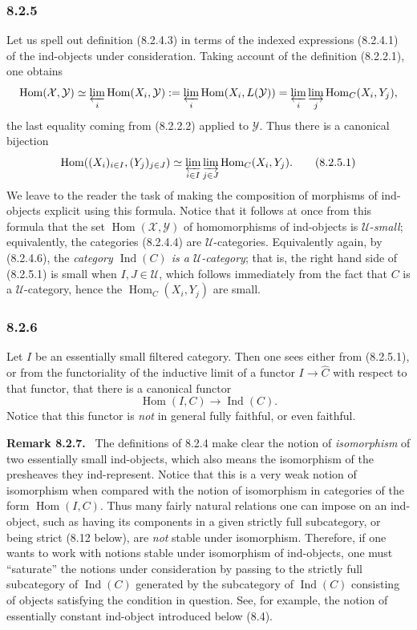 \documentclass[11pt]{article}
\newcommand{\U}{\mathcal{U}}
\newcommand{\Hom}{\operatorname{Hom}}
\newcommand{\Ind}{\operatorname{Ind}}
\newcommand{\Hhom}{\operatorname{Hom}}
\newenvironment{statement}[1]{\par\medskip\noindent\textbf{#1.}\ }{\par\medskip}
\begin{document}
\subsubsection*{8.2.5}
Let us spell out definition (8.2.4.3) in terms of the indexed expressions (8.2.4.1) of the ind-objects under consideration. Taking account of the definition (8.2.2.1), one obtains
\[
\Hom(\mathcal X,\mathcal Y)
\simeq \varprojlim_i \Hom(X_i,\mathcal Y)
\mathrel{:=}\varprojlim_i \Hom(X_i,L(\mathcal Y))
=\varprojlim_i\varinjlim_j\Hom_C(X_i,Y_j),
\]
the last equality coming from (8.2.2.2) applied to $\mathcal Y$. Thus there is a canonical bijection
\[
\Hom((X_i)_{i\in I},(Y_j)_{j\in J})
\simeq \varprojlim_{i\in I}\varinjlim_{j\in J}\Hom_C(X_i,Y_j).
\tag{8.2.5.1}
\]
We leave to the reader the task of making the composition of morphisms of ind-objects explicit using this formula. Notice that it follows at once from this formula that the set $\Hom(\mathcal X,\mathcal Y)$ of homomorphisms of ind-objects is $\U$-\emph{small}; equivalently, the categories (8.2.4.4) are $\U$-categories. Equivalently again, by (8.2.4.6), the \emph{category $\Ind(C)$ is a $\U$-category}; that is, the right hand side of (8.2.5.1) is small when $I,J\in\U$, which follows immediately from the fact that $C$ is a $\U$-category, hence the $\Hom_C(X_i,Y_j)$ are small.

\subsubsection*{8.2.6}
Let $I$ be an essentially small filtered category. Then one sees either from (8.2.5.1), or from the functoriality of the inductive limit of a functor $I\to\widehat C$ with respect to that functor, that there is a canonical functor
\[
\Hhom(I,C)\longrightarrow\Ind(C).
\tag{8.2.6.1}
\]
Notice that this functor is \emph{not} in general fully faithful, or even faithful.

\begin{statement}{Remark 8.2.7}
The definitions of 8.2.4 make clear the notion of \emph{isomorphism} of two essentially small ind-objects, which also means the isomorphism of the presheaves they ind-represent. Notice that this is a very weak notion of isomorphism when compared with the notion of isomorphism in categories of the form $\Hhom(I,C)$. Thus many fairly natural relations one can impose on an ind-object, such as having its components in a given strictly full subcategory, or being strict (8.12 below), are \emph{not} stable under isomorphism. Therefore, if one wants to work with notions stable under isomorphism of ind-objects, one must ``saturate'' the notions under consideration by passing to the strictly full subcategory of $\Ind(C)$ generated by the subcategory of $\Ind(C)$ consisting of objects satisfying the condition in question. See, for example, the notion of essentially constant ind-object introduced below (8.4).
\end{statement}
\end{document}
